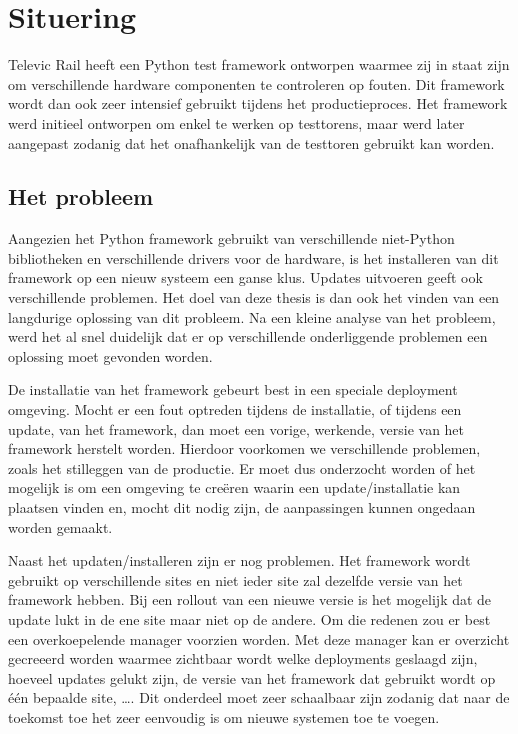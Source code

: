 \chapter{Situering}
Televic Rail heeft een Python test framework ontworpen waarmee zij in staat zijn om verschillende hardware componenten te controleren op fouten.
Dit framework wordt dan ook zeer intensief gebruikt tijdens het productieproces.
Het framework werd initieel ontworpen om enkel te werken op testtorens, maar werd later aangepast zodanig dat het onafhankelijk van de testtoren gebruikt kan worden.

\section{Het probleem}
Aangezien het Python framework gebruikt van verschillende niet-Python bibliotheken en verschillende drivers voor de hardware, is het installeren van dit framework op een nieuw systeem een ganse klus.
Updates uitvoeren geeft ook verschillende problemen.
Het doel van deze thesis is dan ook het vinden van een langdurige oplossing van dit probleem.
Na een kleine analyse van het probleem, werd het al snel duidelijk dat er op verschillende onderliggende problemen een oplossing moet gevonden worden.

De installatie van het framework gebeurt best in een speciale deployment omgeving.
Mocht er een fout optreden tijdens de installatie, of tijdens een update, van het framework, dan moet een vorige, werkende, versie van het framework herstelt worden.
Hierdoor voorkomen we verschillende problemen, zoals het stilleggen van de productie.
Er moet dus onderzocht worden of het mogelijk is om een omgeving te creëren waarin een update/installatie kan plaatsen vinden en, mocht dit nodig zijn, de aanpassingen kunnen ongedaan worden gemaakt.

Naast het updaten/installeren zijn er nog problemen.
Het framework wordt gebruikt op verschillende sites en niet ieder site zal dezelfde versie van het framework hebben.
Bij een rollout van een nieuwe versie is het mogelijk dat de update lukt in de ene site maar niet op de andere.
Om die redenen zou er best een overkoepelende manager voorzien worden.
Met deze manager kan er overzicht gecreeerd worden waarmee zichtbaar wordt welke deployments geslaagd zijn, hoeveel updates gelukt zijn, de versie van het framework dat gebruikt wordt op één bepaalde site, \ldots .
Dit onderdeel moet zeer schaalbaar zijn zodanig dat naar de toekomst toe het zeer eenvoudig is om nieuwe systemen toe te voegen.

